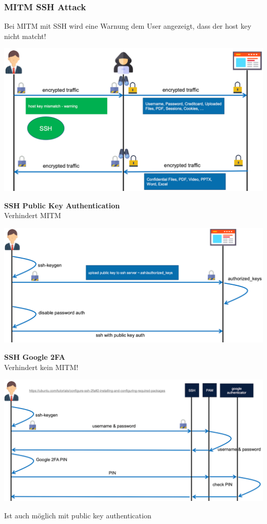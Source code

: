 \subsubsection{MITM SSH Attack}
Bei MITM mit SSH wird eine Warnung dem User angezeigt, dass der host key nicht matcht!
\begin{center}
    \vspace{-8pt}
    \includegraphics[width=.8\linewidth]{./img/09-mitm/ssh_overview}
    \vspace{-8pt}
\end{center}
\textbf{SSH Public Key Authentication}\\
Verhindert MITM
\begin{center}
    \vspace{-8pt}
    \includegraphics[width=.8\linewidth]{./img/09-mitm/pk_auth}
    \vspace{-8pt}
\end{center}

\textbf{SSH Google 2FA}\\
Verhindert kein MITM!
\begin{center}
    \vspace{-8pt}
    \includegraphics[width=.8\linewidth]{./img/09-mitm/ssh_2fa}
    \vspace{-8pt}
\end{center}
Ist auch möglich mit public key authentication
